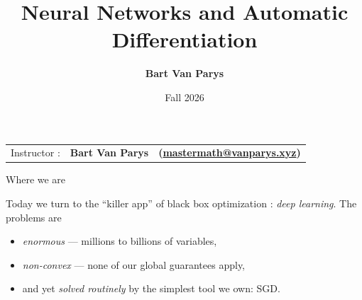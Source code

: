 \documentclass[9pt]{beamer}
\title[Continuous Optimization]{Neural Networks and Automatic Differentiation}
\author[]{\textbf{Bart Van Parys}}
\date[]{Fall 2026}
\begin{document}
\begin{frame}

  \maketitle

  \vspace{-2em}

    \begin{center}
    \begin{tabular}{lll}
      Instructor : & \textbf{Bart Van Parys} & \textbf{(\href{mailto:mastermath@vanparys.xyz}{mastermath@vanparys.xyz})} \\
    \end{tabular}
  \end{center}

\end{frame}

\begin{frame}{Where we are}

  Today we turn to the ``killer app'' of black box optimization : \emph{deep learning}.
  The problems are
  \begin{itemize}
    \setlength\itemsep{0.5em}
  \item \emph{enormous} --- millions to billions of variables,
  \item \emph{non-convex} --- none of our global guarantees apply,
  \item and yet \emph{solved routinely} by the simplest tool we own: SGD.
  \end{itemize}

\end{frame}
\end{document}
